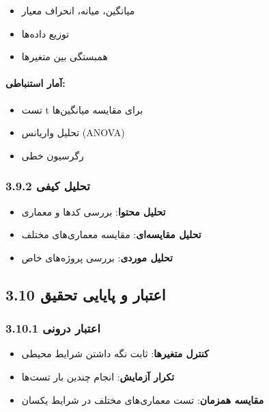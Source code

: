 \documentclass[
]{article}
\providecommand{\tightlist}{%
  \setlength{\itemsep}{0pt}\setlength{\parskip}{0pt}}
\begin{document}
\begin{itemize}
\tightlist
\item
  میانگین، میانه، انحراف معیار
\item
  توزیع داده‌ها
\item
  همبستگی بین متغیرها
\end{itemize}

\paragraph{آمار
استنباطی:}\label{ux622ux645ux627ux631-ux627ux633ux62aux646ux628ux627ux637ux6cc}

\begin{itemize}
\tightlist
\item
  تست t برای مقایسه میانگین‌ها
\item
  تحلیل واریانس (ANOVA)
\item
  رگرسیون خطی
\end{itemize}

\subsubsection{3.9.2 تحلیل
کیفی}\label{ux62aux62dux644ux6ccux644-ux6a9ux6ccux641ux6cc}

\begin{itemize}
\tightlist
\item
  \textbf{تحلیل محتوا}: بررسی کدها و معماری
\item
  \textbf{تحلیل مقایسه‌ای}: مقایسه معماری‌های مختلف
\item
  \textbf{تحلیل موردی}: بررسی پروژه‌های خاص
\end{itemize}

\subsection{3.10 اعتبار و پایایی
تحقیق}\label{ux627ux639ux62aux628ux627ux631-ux648-ux67eux627ux6ccux627ux6ccux6cc-ux62aux62dux642ux6ccux642}

\subsubsection{3.10.1 اعتبار
درونی}\label{ux627ux639ux62aux628ux627ux631-ux62fux631ux648ux646ux6cc}

\begin{itemize}
\tightlist
\item
  \textbf{کنترل متغیرها}: ثابت نگه داشتن شرایط محیطی
\item
  \textbf{تکرار آزمایش}: انجام چندین بار تست‌ها
\item
  \textbf{مقایسه همزمان}: تست معماری‌های مختلف در شرایط یکسان
\end{itemize}
\end{document}
